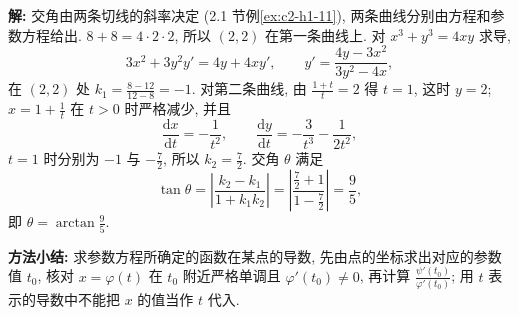 \documentclass[UTF8,openany]{ctexbook}
\theoremstyle{chinesetextbook}
\newenvironment{cnsolution}{\par\indent\textbf{解:} \ignorespaces}{\par}
\newcommand{\dd}{\mathrm d}
\begin{document}
\begin{cnsolution}
交角由两条切线的斜率决定 (2.1 节例\ref{ex:c2-h1-11}), 两条曲线分别由方程和参数方程给出. $8+8=4\cdot2\cdot2$, 所以 $(2,2)$ 在第一条曲线上. 对 $x^3+y^3=4xy$ 求导,
\[
3x^2+3y^2y'=4y+4xy',\qquad y'=\frac{4y-3x^2}{3y^2-4x},
\]
在 $(2,2)$ 处 $\displaystyle k_1=\frac{8-12}{12-8}=-1$. 对第二条曲线, 由 $\displaystyle\frac{1+t}t=2$ 得 $t=1$, 这时 $y=2$; $\displaystyle x=1+\frac1t$ 在 $t>0$ 时严格减少, 并且
\[
\frac{\dd x}{\dd t}=-\frac1{t^2},\qquad\frac{\dd y}{\dd t}=-\frac3{t^3}-\frac1{2t^2},
\]
$t=1$ 时分别为 $-1$ 与 $\displaystyle-\frac72$, 所以 $\displaystyle k_2=\frac72$. 交角 $\theta$ 满足
\[
\tan\theta=\left|\frac{k_2-k_1}{1+k_1k_2}\right|=\left|\frac{\frac72+1}{1-\frac72}\right|=\frac95,
\]
即 $\displaystyle\theta=\arctan\frac95$.
\end{cnsolution}
\par\indent\textbf{方法小结:} 求参数方程所确定的函数在某点的导数, 先由点的坐标求出对应的参数值 $t_0$, 核对 $x=\varphi(t)$ 在 $t_0$ 附近严格单调且 $\varphi'(t_0)\ne0$, 再计算 $\displaystyle\frac{\psi'(t_0)}{\varphi'(t_0)}$; 用 $t$ 表示的导数中不能把 $x$ 的值当作 $t$ 代入.
\end{document}
